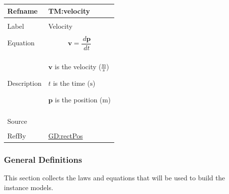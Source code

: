 \documentclass[12pt]{article}
\begin{document}
\begin{minipage}{\textwidth}
\begin{tabular}{>{\raggedright}p{}>{\raggedright\arraybackslash}p{}}
\toprule \textbf{Refname} & \textbf{TM:velocity}
\label{TM:velocity}
\\ \midrule \\
Label & Velocity
        
\\ \midrule \\
Equation & \begin{displaymath}
           \symbf{v}=\frac{\,d\symbf{p}}{\,dt}
           \end{displaymath}
\\ \midrule \\
Description & \begin{symbDescription}
              \item{$\symbf{v}$ is the velocity ($\frac{\text{m}}{\text{s}}$)}
              \item{$t$ is the time (${\text{s}}$)}
              \item{$\symbf{p}$ is the position (${\text{m}}$)}
              \end{symbDescription}
\\ \midrule \\
Source & \cite{velocityWiki}
         
\\ \midrule \\
RefBy & \hyperref[GD:rectPos]{GD:rectPos}
        
\\ \bottomrule
\end{tabular}
\end{minipage}
\subsubsection{General Definitions}
\label{Sec:GDs}
This section collects the laws and equations that will be used to build the instance models.
\end{document}
